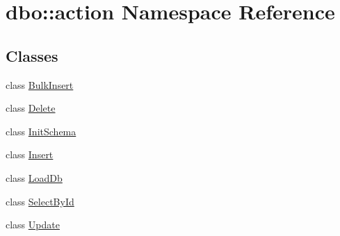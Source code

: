 \hypertarget{namespacedbo_1_1action}{\section{dbo\+:\+:action Namespace Reference}
\label{namespacedbo_1_1action}
}
\subsection*{Classes}
\begin{DoxyCompactItemize}
\item 
class \hyperlink{classdbo_1_1action_1_1_bulk_insert}{Bulk\+Insert}
\item 
class \hyperlink{classdbo_1_1action_1_1_delete}{Delete}
\item 
class \hyperlink{classdbo_1_1action_1_1_init_schema}{Init\+Schema}
\item 
class \hyperlink{classdbo_1_1action_1_1_insert}{Insert}
\item 
class \hyperlink{classdbo_1_1action_1_1_load_db}{Load\+Db}
\item 
class \hyperlink{classdbo_1_1action_1_1_select_by_id}{Select\+By\+Id}
\item 
class \hyperlink{classdbo_1_1action_1_1_update}{Update}
\end{DoxyCompactItemize}
